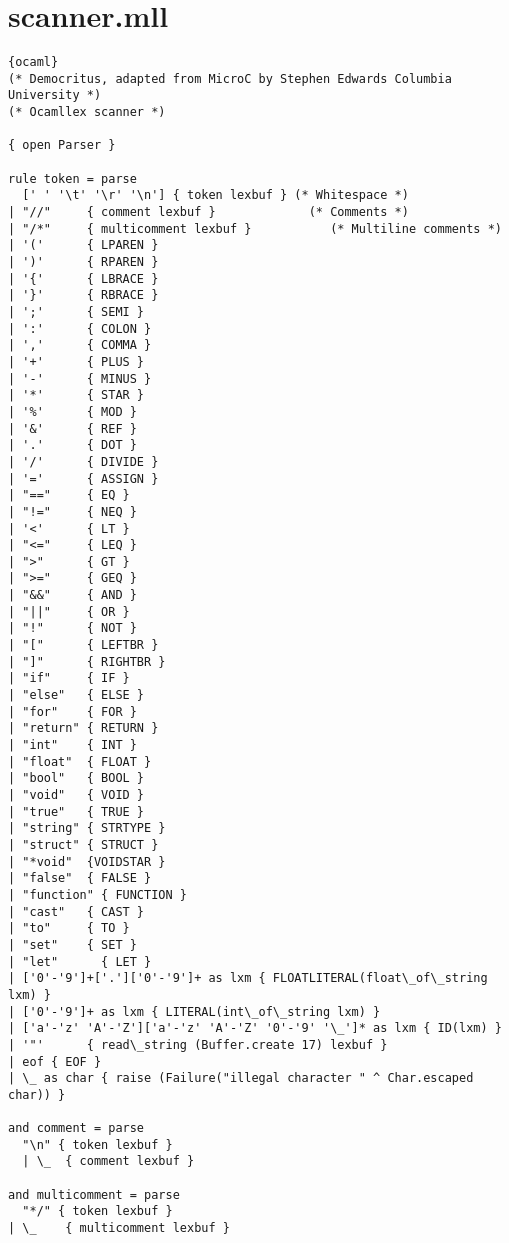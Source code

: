 \section{scanner.mll}
\begin{lstlisting}{ocaml}
(* Democritus, adapted from MicroC by Stephen Edwards Columbia University *)
(* Ocamllex scanner *)

{ open Parser }

rule token = parse
  [' ' '\t' '\r' '\n'] { token lexbuf } (* Whitespace *)
| "//"     { comment lexbuf }             (* Comments *)
| "/*"     { multicomment lexbuf }           (* Multiline comments *)
| '('      { LPAREN }
| ')'      { RPAREN }
| '{'      { LBRACE }
| '}'      { RBRACE }
| ';'      { SEMI }
| ':'      { COLON }
| ','      { COMMA }
| '+'      { PLUS }
| '-'      { MINUS }
| '*'      { STAR }
| '%'	   { MOD }
| '&'	   { REF }
| '.'      { DOT }
| '/'      { DIVIDE }
| '='      { ASSIGN }
| "=="     { EQ }
| "!="     { NEQ }
| '<'      { LT }
| "<="     { LEQ }
| ">"      { GT }
| ">="     { GEQ }
| "&&"     { AND }
| "||"     { OR }
| "!"      { NOT }
| "["      { LEFTBR }
| "]"      { RIGHTBR }
| "if"     { IF }
| "else"   { ELSE }
| "for"    { FOR }
| "return" { RETURN }
| "int"    { INT }
| "float"  { FLOAT }
| "bool"   { BOOL }
| "void"   { VOID }
| "true"   { TRUE }
| "string" { STRTYPE }
| "struct" { STRUCT }
| "*void"  {VOIDSTAR }
| "false"  { FALSE }
| "function" { FUNCTION }
| "cast"   { CAST }
| "to"     { TO }
| "set"    { SET }
| "let"      { LET }
| ['0'-'9']+['.']['0'-'9']+ as lxm { FLOATLITERAL(float\_of\_string lxm) }
| ['0'-'9']+ as lxm { LITERAL(int\_of\_string lxm) }
| ['a'-'z' 'A'-'Z']['a'-'z' 'A'-'Z' '0'-'9' '\_']* as lxm { ID(lxm) }
| '"'      { read\_string (Buffer.create 17) lexbuf }
| eof { EOF }
| \_ as char { raise (Failure("illegal character " ^ Char.escaped char)) }

and comment = parse
  "\n" { token lexbuf }
  | \_  { comment lexbuf }

and multicomment = parse
  "*/" { token lexbuf }
| \_    { multicomment lexbuf }


\end{lstlisting}
